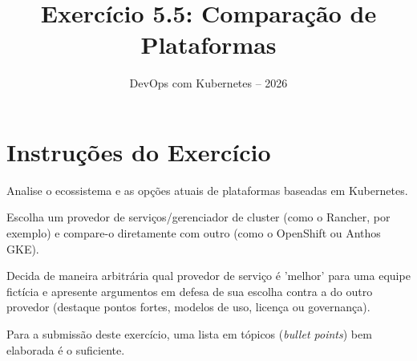 \documentclass[11pt,a4paper]{article}
\title{\color{secondary}\Huge\textbf{Exercício 5.5: Comparação de Plataformas}}
\author{\color{primary}DevOps com Kubernetes -- 2026}
\date{}
\begin{document}
\maketitle

\section*{\color{primary}Instruções do Exercício}
\begin{tcolorbox}[colback=blue!5!white,colframe=blue!75!black,title=Exercício 5.5: Comparação de Plataformas]
Analise o ecossistema e as opções atuais de plataformas baseadas em Kubernetes.

Escolha um provedor de serviços/gerenciador de cluster (como o Rancher, por exemplo) e compare-o diretamente com outro (como o OpenShift ou Anthos GKE). 

Decida de maneira arbitrária qual provedor de serviço é 'melhor' para uma equipe fictícia e apresente argumentos em defesa de sua escolha contra a do outro provedor (destaque pontos fortes, modelos de uso, licença ou governança).

Para a submissão deste exercício, uma lista em tópicos (\textit{bullet points}) bem elaborada é o suficiente.
\end{tcolorbox}
\end{document}
